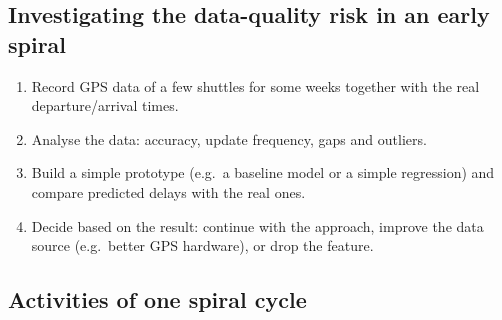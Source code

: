 \documentclass[11pt,a4paper]{article}
\begin{document}
\subsection*{Investigating the data-quality risk in an early spiral}

\begin{enumerate}[itemsep=0.1em]
  \item Record GPS data of a few shuttles for some weeks together with the
        real departure/arrival times.
  \item Analyse the data: accuracy, update frequency, gaps and outliers.
  \item Build a simple prototype (e.g.\ a baseline model or a simple
        regression) and compare predicted delays with the real ones.
  \item Decide based on the result: continue with the approach, improve
        the data source (e.g.\ better GPS hardware), or drop the feature.
\end{enumerate}

\subsection*{Activities of one spiral cycle}

\begin{center}
\end{center}
\end{document}
